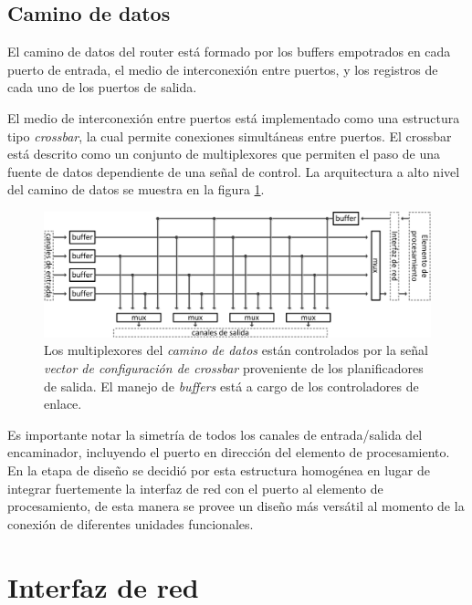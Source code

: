 \subsection{Camino de datos}\label{subsec:camino_de_datos}

El camino de datos del router está formado por los buffers empotrados en cada puerto de entrada, el medio de interconexión entre puertos, y los registros de cada uno de los puertos de salida.

El medio de interconexión entre puertos está implementado como una estructura tipo \textit{crossbar}, la cual permite conexiones simultáneas entre puertos. El crossbar está descrito como un conjunto de multiplexores que permiten el paso de una fuente de datos dependiente de una señal de control. La arquitectura a alto nivel del camino de datos se muestra en la figura \ref{fig:ch4_camino_de_datos}.

\begin{figure}
	\begin{center}
		\includegraphics[scale=0.6]{figures/ch4_camino_de_datos.png}
	\end{center}
	\caption
		{	
			Los multiplexores del \textit{camino de datos} están controlados por la señal \textit{vector de configuración de crossbar} proveniente de los planificadores de salida. El manejo de \textit{buffers} está a cargo de los controladores de enlace.
		}
	\label{fig:ch4_camino_de_datos}
\end{figure}

Es importante notar la simetría de todos los canales de entrada/salida del encaminador, incluyendo el puerto en dirección del elemento de procesamiento. En la etapa de diseño se decidió por esta estructura homogénea en lugar de integrar fuertemente la interfaz de red con el puerto al elemento de procesamiento, de esta manera se provee un diseño más versátil al momento de la conexión de diferentes unidades funcionales.


\section{Interfaz de red}\label{sec:encaminador_de_red}

